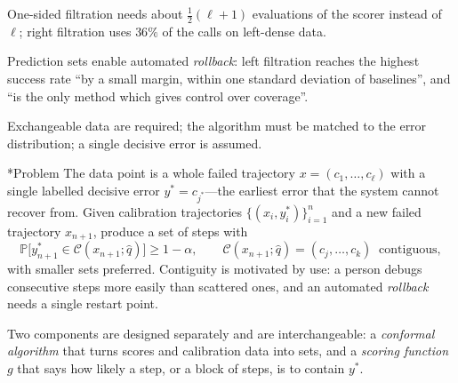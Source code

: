 \documentclass[11pt]{article}
\makeatletter
\theoremstyle{definition}
\renewcommand\subsection{\@startsection{subsection}{2}{\z@}{-3.25ex\@plus -1ex \@minus -.2ex}{1.5ex \@plus .2ex}{\normalfont\large\bfseries\color{secblue}}}
\newcommand{\C}{\mathcal{C}}
\newcommand{\qhat}{\hat{q}}
\newcommand{\PP}{\mathbb{P}}
\newcommand{\ystar}{y^*}
\newcommand{\jstar}{j^*}
\makeatother
\begin{document}
\begin{claimbox}
\begin{description}[leftmargin=2.6em,labelwidth=2.1em,labelsep=0.5em,itemsep=2pt,topsep=4pt]
\item[\ctag{A6}]  One-sided filtration needs about $\frac12(\ell+1)$ evaluations of the scorer instead of $\ell$; right filtration uses $36\%$ of the calls on left-dense data.
\item[\ctag{A7}]  Prediction sets enable automated \emph{rollback}: left filtration reaches the highest success rate ``by a small margin, within one standard deviation of baselines'', and ``is the only method which gives control over coverage''.
\item[\ctag{A8}]  Exchangeable data are required; the algorithm must be matched to the error distribution; a single decisive error is assumed.
\end{description}
\end{claimbox}

\subsection*{Problem}
The data point is a whole failed trajectory $x=(c_1,\dots,c_\ell)$ with a single labelled decisive error $\ystar=c_{\jstar}$---the earliest error that the system cannot recover from. Given calibration trajectories $\{(x_i,\ystar_i)\}_{i=1}^n$ and a new failed trajectory $x_{n+1}$, produce a set of steps with
\begin{equation}\label{eq:caea-goal}
\PP\big[\ystar_{n+1}\in\C(x_{n+1};\qhat)\big]\ge1-\alpha,\qquad\C(x_{n+1};\qhat)=(c_j,\dots,c_k)\ \text{ contiguous},
\end{equation}
with smaller sets preferred. Contiguity is motivated by use: a person debugs consecutive steps more easily than scattered ones, and an automated \emph{rollback} needs a single restart point.

Two components are designed separately and are interchangeable: a \emph{conformal algorithm} that turns scores and calibration data into sets, and a \emph{scoring function} $g$ that says how likely a step, or a block of steps, is to contain $\ystar$.
\end{document}
